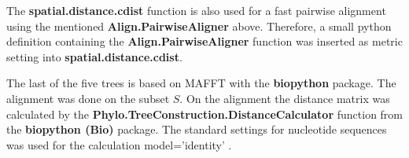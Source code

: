     


The \textbf{spatial.distance.cdist} function is also used for a fast pairwise alignment using the mentioned \textbf{Align.PairwiseAligner} above. Therefore, a small python definition containing the \textbf{Align.PairwiseAligner} function was inserted as metric setting into \textbf{spatial.distance.cdist}. 

The last of the five trees is based on MAFFT with the \textbf{biopython} package. The alignment was done on the subset $S$. On the alignment the distance matrix was calculated by the \textbf{Phylo.TreeConstruction.DistanceCalculator} function from the \textbf{biopython (Bio)} package. The standard settings for nucleotide sequences was used for the calculation \colorbox{backcolour}{model='identity'} \autocite{cock_biopython_2009}.




    


